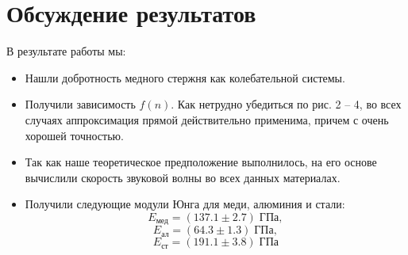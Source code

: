 \documentclass[a4paper, 10pt, twocolumn]{article}
\begin{document}
\section{Обсуждение результатов}
В результате работы мы:
\begin{itemize}
    \item Нашли добротность медного стержня как колебательной системы.

    \item Получили зависимость $f(n)$. Как нетрудно убедиться по рис. 2 -- 4,
    во всех случаях аппроксимация прямой действительно применима, причем с очень
    хорошей точностью.

    \item Так как наше теоретическое предположение выполнилось, на его основе
    вычислили скорость звуковой волны во всех данных материалах.

    \item Получили следующие модули Юнга для меди, алюминия и стали:
    $$ E_{\text{мед}} = (137.1\pm2.7)\;\text{ГПа}, $$
    $$ E_{\text{ал}}  = (64.3\pm1.3)\;\text{ГПа}, $$
    $$ E_{\text{ст}}   = (191.1\pm3.8)\;\text{ГПа} $$
\end{itemize}
\end{document}
